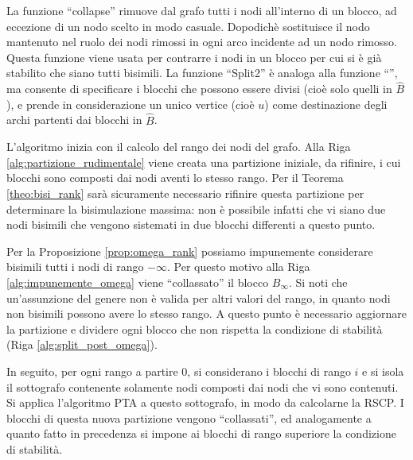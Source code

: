 La funzione ``collapse'' rimuove dal grafo tutti i nodi all'interno di un blocco, ad eccezione di un nodo scelto in modo casuale. Dopodichè sostituisce il nodo mantenuto nel ruolo dei nodi rimossi in ogni arco incidente ad un nodo rimosso. Questa funzione viene usata per contrarre i nodi in un blocco per cui si è già stabilito che siano tutti bisimili. La funzione ``Split2'' è analoga alla funzione ``\splitfunc'', ma consente di specificare i blocchi che possono essere divisi (cioè solo quelli in $\widehat{B}$), e prende in considerazione un unico vertice (cioè $u$) come destinazione degli archi partenti dai blocchi in $\widehat{B}$.

L'algoritmo inizia con il calcolo del rango dei nodi del grafo. Alla Riga \ref{alg:partizione_rudimentale} viene creata una partizione iniziale, da rifinire, i cui blocchi sono composti dai nodi aventi lo stesso rango. Per il Teorema \ref{theo:bisi_rank} sarà sicuramente necessario rifinire questa partizione per determinare la bisimulazione massima: non è possibile infatti che vi siano due nodi bisimili che vengono sistemati in due blocchi differenti a questo punto.

Per la Proposizione \ref{prop:omega_rank} possiamo impunemente considerare bisimili tutti i nodi di rango $-\infty$. Per questo motivo alla Riga \ref{alg:impunemente_omega} viene ``collassato'' il blocco $B_\infty$. Si noti che un'assunzione del genere non è valida per altri valori del rango, in quanto nodi non bisimili possono avere lo stesso rango. A questo punto è necessario aggiornare la partizione e dividere ogni blocco che non rispetta la condizione di stabilità (Riga \ref{alg:split_post_omega}).

In seguito, per ogni rango a partire 0, si considerano i blocchi di rango $i$ e si isola il sottografo contenente solamente nodi composti dai nodi che vi sono contenuti. Si applica l'algoritmo PTA a questo sottografo, in modo da calcolarne la RSCP. I blocchi di questa nuova partizione vengono ``collassati'', ed analogamente a quanto fatto in precedenza si impone ai blocchi di rango superiore la condizione di stabilità.

